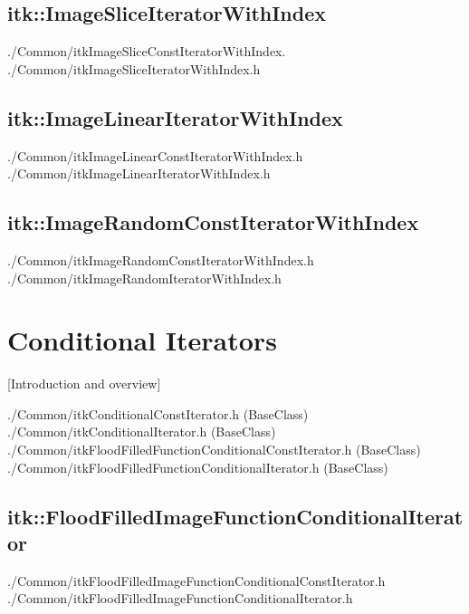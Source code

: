 \subsection{itk::ImageSliceIteratorWithIndex}
\label{sec:itkImageSliceIteratorWithIndex}
./Common/itkImageSliceConstIteratorWithIndex.
./Common/itkImageSliceIteratorWithIndex.h

\subsection{itk::ImageLinearIteratorWithIndex}
\label{sec:itkImageLinearIteratorWithIndex}
./Common/itkImageLinearConstIteratorWithIndex.h
./Common/itkImageLinearIteratorWithIndex.h

\subsection{itk::ImageRandomConstIteratorWithIndex}
\label{sec:itkImageRandomConstIteratorWithIndex}
./Common/itkImageRandomConstIteratorWithIndex.h
./Common/itkImageRandomIteratorWithIndex.h


\section{Conditional Iterators}
\label{sec:ConditionalIterators}

[Introduction and overview]

./Common/itkConditionalConstIterator.h (BaseClass)
./Common/itkConditionalIterator.h (BaseClass)
./Common/itkFloodFilledFunctionConditionalConstIterator.h (BaseClass)
./Common/itkFloodFilledFunctionConditionalIterator.h (BaseClass)


%

\subsection{itk::FloodFilledImageFunctionConditionalIterator}
\label{itk::FloodFilledImageFunctionConditionalIterator}
./Common/itkFloodFilledImageFunctionConditionalConstIterator.h
./Common/itkFloodFilledImageFunctionConditionalIterator.h


